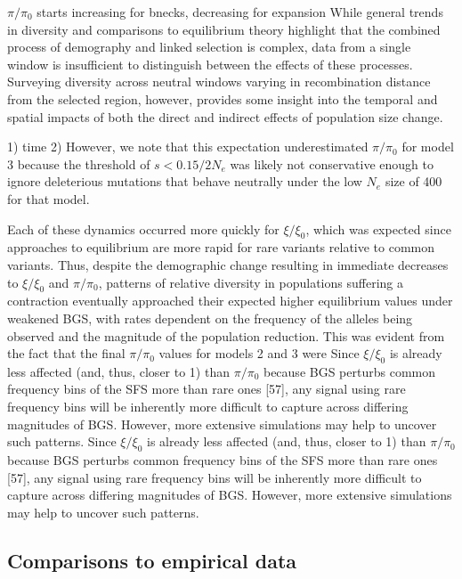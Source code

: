\documentclass[9pt,twocolumn,twoside]{rilabRxiv}
\begin{document}
$\pi/\pi_0$ starts increasing for bnecks, decreasing for expansion
While general trends in diversity and comparisons to equilibrium theory highlight that the combined process of demography and linked selection is complex, data from a single window is insufficient to distinguish between the effects of these processes.
Surveying diversity across neutral windows varying in recombination distance from the selected region, however, provides some insight into the temporal and spatial impacts of both the direct and indirect effects of population size change. 


1) time 2) However, we note that this expectation underestimated $\pi/\pi_0$ for model 3 because the threshold of $s < 0.15/2N_e$ was likely not conservative enough to ignore deleterious mutations that behave neutrally under the low $N_e$ size of 400 for that model.


Each of these dynamics occurred more quickly for $\xi/\xi_0$, which was expected since approaches to equilibrium are more rapid for rare variants relative to common variants.
Thus, despite the demographic change resulting in immediate decreases to $\xi/\xi_0$ and $\pi/\pi_0$, patterns of relative diversity in populations suffering a contraction eventually approached their expected higher equilibrium values under weakened BGS, with rates dependent on the frequency of the alleles being observed and the  magnitude of the population reduction. 
This was evident from the fact that the final $\pi/\pi_0$ values for models 2 and 3 were
Since $\xi/\xi_0$ is already less affected (and, thus, closer to 1) than $\pi/\pi_0$ because BGS perturbs common frequency bins of the SFS more than rare ones [57], any signal using rare frequency bins will be inherently more difficult to capture across differing magnitudes of BGS. However, more extensive simulations may help to uncover such patterns.
Since $\xi/\xi_0$ is already less affected (and, thus, closer to 1) than $\pi/\pi_0$ because BGS perturbs common frequency
bins of the SFS more than rare ones [57], any signal using rare
frequency bins will be inherently more difficult to capture across
differing magnitudes of BGS. However, more extensive simulations may
help to uncover such patterns.


\subsection{Comparisons to empirical data}
\end{document}
